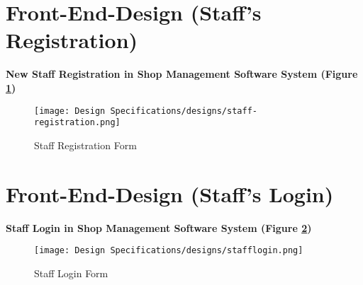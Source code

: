\section{Front-End-Design (Staff's Registration)}
\vspace{2cm}
\textbf{New Staff Registration in Shop Management Software System (Figure \ref{fig:fig 5.10})}\\

\begin{figure}[ht]
    \centering  
    \texttt{[image: Design Specifications/designs/staff-registration.png]}    
    \caption{Staff Registration Form}
    \label{fig:fig 5.10}
\end{figure}

\section{Front-End-Design (Staff's Login)}
\textbf{Staff Login in Shop Management Software System (Figure \ref{fig:fig 5.11})}\\

\begin{figure}[ht]
    \centering  
    \texttt{[image: Design Specifications/designs/stafflogin.png]}    
    \caption{Staff Login Form}
    \label{fig:fig 5.11}
\end{figure}
